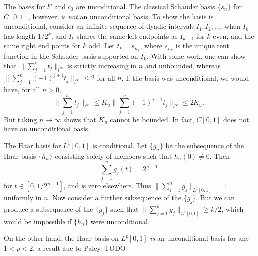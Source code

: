 \begin{example}
    The bases for $l^p$ and $c_0$ are uncoditional. The classical Schauder basis $\{ s_n \}$ for $C[0,1]$, however, is \emph{not} an unconditional basis. To show the basis is unconditional, consider an infinite sequence of dyadic intervals $I_1, I_2, \dots$, when $I_k$ has length $1/2^k$, and $I_k$ shares the same left endpoints as $I_{k-1}$ for $k$ even, and the same right end points for $k$ odd. Let $t_k = s_{n_k}$, where $s_{n_k}$ is the unique tent function in the Schauder basis supported on $I_k$. With some work, one can show that $\| \sum_{j = 1}^n t_j \|_{l^\infty}$ is strictly increasing in $n$ and unbounded, whereas $\| \sum_{j = 1}^n (-1)^{j+1} t_j \|_{l^\infty} \leq 2$ for all $n$. If the basis was unconditional, we would have, for all $n > 0$,
    \[ \| \sum_{j = 1}^n t_j \|_{l^\infty} \leq K_u \| \sum_{j = 1}^n (-1)^{j+1} t_j \|_{l^\infty} \leq 2K_u. \]
    But taking $n \to \infty$ shows that $K_u$ cannot be bounded. In fact, $C[0,1]$ does not have an unconditional basis.
\end{example}

\begin{example}
    The Haar basis for $L^1[0,1]$ is conditional. Let $\{ g_n \}$ be the subsequence of the Haar basis $\{ h_n \}$ consisting solely of members such that $h_n(0) \neq 0$. Then
    \[ \sum_{j = 1}^n g_j(t) = 2^{n-1} \]
    for $t \in [0,1/2^{n-1}]$, and is zero elsewhere. Thus $\| \sum_{j = 1}^n g_j \|_{L^1[0,1]} = 1$ uniformly in $n$. Now consider a further subsequence of the $\{ g_j \}$. But we can produce a subsequence of the $\{ g_j \}$ such that $\| \sum_{j = 1}^k g_j \|_{L^1[0,1]} \geq k/2$, which would be impossible if $\{ h_n \}$ were unconditional.

    On the other hand, the Haar basis on $L^p[0,1]$ \emph{is} an unconditional basis for any $1 < p < 2$, a result due to Paley. TODO
\end{example}

